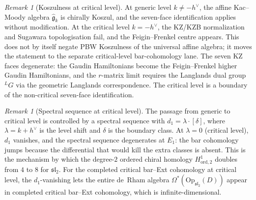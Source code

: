 \documentclass[11pt]{article}
\theoremstyle{plain}
\theoremstyle{definition}
\theoremstyle{remark}
\newtheorem{remark}[theorem]{Remark}
\newcommand{\fg}{\mathfrak{g}}
\newcommand{\fsl}{\mathfrak{sl}}
\numberwithin{equation}{section}
\begin{document}
\begin{remark}[Koszulness at critical level]\label{rem:koszul-critical}
At generic level $k \neq -h^\vee$, the affine Kac--Moody algebra
$\widehat{\fg}_k$ is chirally Koszul, and the seven-face
identification applies without modification. At the critical level
$k = -h^\vee$,
the KZ/KZB normalization and Sugawara topologisation fail, and the
Feigin--Frenkel centre appears. This does not by itself negate PBW
Koszulness of the universal affine algebra; it moves the statement to
the separate critical-level bar-cohomology lane. The seven KZ faces
degenerate: the Gaudin Hamiltonians become the Feigin--Frenkel higher
Gaudin
Hamiltonians, and the $r$-matrix limit requires the Langlands dual
group ${}^L G$ via the geometric Langlands correspondence. The
critical level is a boundary of the non-critical seven-face
identification.
\end{remark}

\begin{remark}[Spectral sequence at critical
level]\label{rem:spectral-critical}
The passage from generic to critical level is controlled by a spectral
sequence with $d_1 = \lambda \cdot [\delta]$, where
$\lambda = k + h^\vee$ is the level shift and $\delta$ is the boundary
class. At $\lambda = 0$ (critical level), $d_1$ vanishes, and the
spectral sequence degenerates at $E_1$: the bar cohomology jumps
because the differential that would kill the extra classes is absent.
This is the mechanism by which the degree-$2$ ordered chiral homology
$H^1_{\mathrm{ord}, 2}$ doubles from $4$ to $8$ for $\fsl_2$. For the
completed critical bar--Ext cohomology at critical level, the
\(d_1\)-vanishing
lets the entire de~Rham algebra $\Omega^*(\mathrm{Op}_{\fsl_2}(D))$
appear in completed critical bar--Ext cohomology, which is
infinite-dimensional.
\end{remark}


\end{document}
